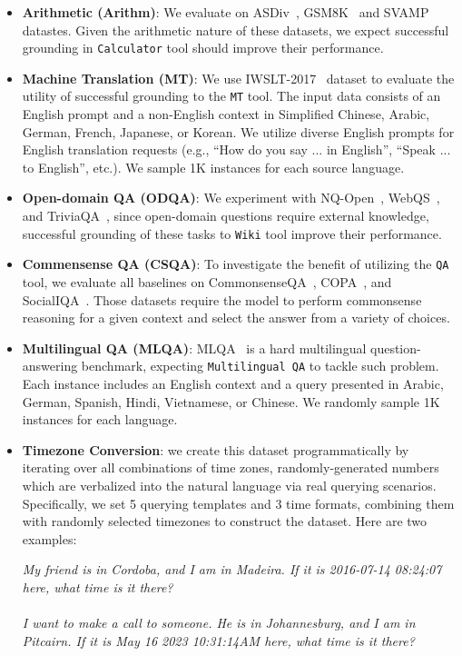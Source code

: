 \documentclass[11pt]{article}
\newcommand{\calc}{{\tt Calculator}}
\newcommand{\mt}{{\tt MT}}
\newcommand{\qa}{{\tt QA}}
\newcommand{\wiki}{{\tt Wiki}}
\newcommand{\mlqa}{{\tt Multilingual QA}}
\begin{document}
\begin{itemize}[leftmargin=0.1in]
    \item \textbf{Arithmetic (Arithm)}: 
    We evaluate on ASDiv~\citep{miao-etal-2020-diverse}, GSM8K~\citep{cobbe2021gsm8k} and SVAMP~\citep{patel-etal-2021-nlp} datastes. Given the arithmetic nature of these datasets, we expect successful grounding in \calc{} tool should improve their performance.  
    \item \textbf{Machine Translation (MT)}: We use IWSLT-2017~\citep{cettolo-etal-2017-overview} dataset to evaluate the utility of successful grounding to the \mt{} tool. The input data consists of an English prompt and a non-English context in Simplified Chinese, Arabic, German, French, Japanese, or Korean. We utilize diverse English prompts for English translation requests (e.g., ``How do you say ... in English'', ``Speak ... to English'', etc.). We sample 1K instances for each source language.
    \item \textbf{Open-domain QA (ODQA)}: We experiment with NQ-Open~\citep{lee2019latent}, WebQS~\citep{berant2013semantic}, and TriviaQA~\citep{joshi-etal-2017-triviaqa}, since open-domain questions require external knowledge, successful grounding of these tasks to \wiki{} tool improve their performance.
    \item \textbf{Commensense QA (CSQA)}: To investigate the benefit of utilizing the \qa{} tool, we evaluate all baselines on CommonsenseQA~\citep{talmor-etal-2019-commonsenseqa}, COPA~\citep{roemmele2011choice}, and SocialIQA~\citep{sap-etal-2019-social}. Those datasets require the model to perform commonsense reasoning for a given context and select the answer from a variety of choices.
    \item \textbf{Multilingual QA (MLQA)}: MLQA~\citep{lewis2019mlqa} is a hard multilingual question-answering benchmark, expecting \mlqa{} to tackle such problem. Each instance includes an English context and a query presented in Arabic, German, Spanish, Hindi, Vietnamese, or Chinese. We randomly sample 1K instances for each language.
    \item \textbf{Timezone Conversion}: we create this dataset programmatically by iterating over all combinations of time zones, randomly-generated numbers which are verbalized into the natural language via real querying scenarios. Specifically, we set 5 querying templates and 3 time formats, combining them with randomly selected timezones to construct the dataset.
    Here are two examples:
    \begin{mdframed}
    \footnotesize
    \textit{My friend is in Cordoba, and I am in Madeira. If it is 2016-07-14 08:24:07 here, what time is it there?} \\
    \\
    \textit{I want to make a call to someone. He is in Johannesburg, and I am in Pitcairn. If it is May 16 2023 10:31:14AM here, what time is it there?}
    \end{mdframed}


\end{itemize}
\end{document}
